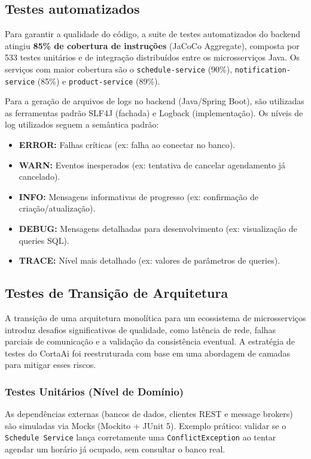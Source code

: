 \documentclass[
    12pt, 
    a4paper, 
    oneside, 
    chapter=TITLE, 
    section=TITLE
]{abntex2}
\begin{document}
\subsection{Testes automatizados}
Para garantir a qualidade do código, a suite de testes automatizados do backend atingiu \textbf{85\% de cobertura de instruções} (JaCoCo Aggregate), composta por 533 testes unitários e de integração distribuídos entre os microsserviços Java. Os serviços com maior cobertura são o \texttt{schedule-service} (90\%), \texttt{notification-service} (85\%) e \texttt{product-service} (89\%).

Para a geração de arquivos de logs no backend (Java/Spring Boot), são utilizadas as ferramentas padrão SLF4J (fachada) e Logback (implementação). Os níveis de log utilizados seguem a semântica padrão:
\begin{itemize}
    \item \textbf{ERROR:} Falhas críticas (ex: falha ao conectar no banco).
    \item \textbf{WARN:} Eventos inesperados (ex: tentativa de cancelar agendamento já cancelado).
    \item \textbf{INFO:} Mensagens informativas de progresso (ex: confirmação de criação/atualização).
    \item \textbf{DEBUG:} Mensagens detalhadas para desenvolvimento (ex: visualização de queries SQL).
    \item \textbf{TRACE:} Nível mais detalhado (ex: valores de parâmetros de queries).
\end{itemize}

\subsection{Testes de Transição de Arquitetura}
A transição de uma arquitetura monolítica para um ecossistema de microsserviços introduz desafios significativos de qualidade, como latência de rede, falhas parciais de comunicação e a validação da consistência eventual. A estratégia de testes do CortaAi foi reestruturada com base em uma abordagem de camadas para mitigar esses riscos.

\subsubsection{Testes Unitários (Nível de Domínio)}
As dependências externas (bancos de dados, clientes REST e message brokers) são simuladas via Mocks (Mockito + JUnit 5). Exemplo prático: validar se o \texttt{Schedule Service} lança corretamente uma \texttt{ConflictException} ao tentar agendar um horário já ocupado, sem consultar o banco real.
\end{document}
